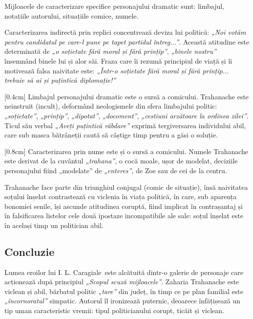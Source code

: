 \documentclass[
12pt,                        %
a4paper                      %
]{article}
\newcommand{\operaauthor}{I. L. Caragiale\ } %
\begin{document}
Mijloacele de caracterizare specifice personajului dramatic sunt: limbajul, notațiile autorului, situațiile comice, numele.

Caracterizarea indirectă prin replici concentrează deviza lui politică: \textit{„Noi votăm pentru candidatul pe care-l pune pe tapet partidul întreg...”}. Această atitudine este determinată de \textit{„o soțietate fără moral și fără prințip”}, \textit{„binele nostru”} însemnând binele lui și alor săi. Fraza care îi rezumă principiul de viață și îi motivează falsa naivitate este: \textit{„Într-o soțietate fără moral și fără prințip... trebuie să ai și puțintică diplomație!”}

[0.4cm]
Limbajul personajului dramatic este o sursă a comicului. Trahanache este neinstruit (incult), deformând neologismele din sfera limbajului politic: \textit{„soțietate”}, \textit{„prințip”}, \textit{„dipotat”}, \textit{„docoment”}, \textit{„cestiuni arzătoare la ordinea zilei”}. Ticul său verbal \textit{„Aveți puțintică răbdare”} exprimă tergiversarea individului abil, care sub masca bătrâneții caută să câștige timp pentru a găsi o soluție.

[0.8cm]
Caracterizarea prin nume este și o sursă a comicului. Numele Trahanache este derivat de la cuvântul \textit{„trahana”}, o cocă moale, ușor de modelat, deciziile personajului fiind „modelate” de \textit{„enteres”}, de Zoe sau de cei de la centru.

Trahanache face parte din triunghiul conjugal (comic de situație), însă naivitatea soțului înșelat contrastează cu viclenia în viața politică, în care, sub aparența bonomiei senile, își ascunde atitudinea coruptă, fiind implicat în contrașantaj și în falsificarea listelor cele două ipostaze incompatibile ale sale: soțul înșelat este în același timp un politician abil.

\subsection{Concluzie}

Lumea eroilor lui \operaauthor este alcătuită dintr-o galerie de personaje care acționează după principiul \textit{„Scopul scuză mijloacele”}. Zaharia Trahanache este viclean și abil, bărbatul politic \textit{„tare”} din județ, în timp ce pe plan familial este \textit{„încornoratul”} simpatic. Autorul îl ironizează puternic, deoarece înfățișează un tip uman caracteristic vremii: tipul politicianului corupt, ticăit și viclean.
\end{document}
